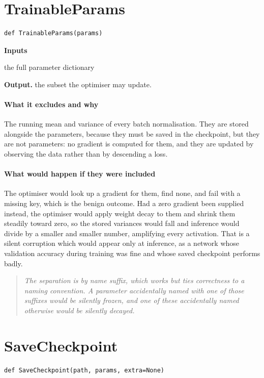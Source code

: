 \section{TrainableParams}
\begin{lstlisting}[style=sig]
def TrainableParams(params)
\end{lstlisting}

\noindent\textbf{Inputs}
\begin{description}[leftmargin=2.2em,style=nextline,font=\normalfont\ttfamily]\setlength\itemsep{1pt}
  \item[{params}] \normalfont the full parameter dictionary
\end{description}

\noindent\textbf{Output.} the subset the optimiser may update.


\paragraph{What it excludes and why}
The running mean and variance of every batch normalisation. They are stored alongside the parameters, because they must be saved in the checkpoint, but they are not parameters: no gradient is computed for them, and they are updated by observing the data rather than by descending a loss.


\paragraph{What would happen if they were included}
The optimiser would look up a gradient for them, find none, and fail with a missing key, which is the benign outcome. Had a zero gradient been supplied instead, the optimiser would apply weight decay to them and shrink them steadily toward zero, so the stored variances would fall and inference would divide by a smaller and smaller number, amplifying every activation. That is a silent corruption which would appear only at inference, as a network whose validation accuracy during training was fine and whose saved checkpoint performs badly.


\begin{quote}\small\itshape The separation is by name suffix, which works but ties correctness to a naming convention. A parameter accidentally named with one of those suffixes would be silently frozen, and one of these accidentally named otherwise would be silently decayed.\end{quote}

\section{SaveCheckpoint}
\begin{lstlisting}[style=sig]
def SaveCheckpoint(path, params, extra=None)
\end{lstlisting}

